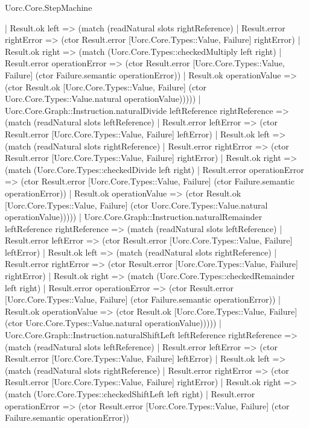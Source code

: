 \begin{lexlean}{Uorc.Core.StepMachine}
\begin{semanticmodule}
{      | Result.ok left => (match (readNatural slots rightReference)
        | Result.error rightError => (ctor Result.error [Uorc.Core.Types::Value, Failure] rightError)
        | Result.ok right => (match (Uorc.Core.Types::checkedMultiply left right)
          | Result.error operationError => (ctor Result.error [Uorc.Core.Types::Value, Failure] (ctor Failure.semantic operationError))
          | Result.ok operationValue => (ctor Result.ok [Uorc.Core.Types::Value, Failure] (ctor Uorc.Core.Types::Value.natural operationValue)))))
    | Uorc.Core.Graph::Instruction.naturalDivide leftReference rightReference => (match (readNatural slots leftReference)
      | Result.error leftError => (ctor Result.error [Uorc.Core.Types::Value, Failure] leftError)
      | Result.ok left => (match (readNatural slots rightReference)
        | Result.error rightError => (ctor Result.error [Uorc.Core.Types::Value, Failure] rightError)
        | Result.ok right => (match (Uorc.Core.Types::checkedDivide left right)
          | Result.error operationError => (ctor Result.error [Uorc.Core.Types::Value, Failure] (ctor Failure.semantic operationError))
          | Result.ok operationValue => (ctor Result.ok [Uorc.Core.Types::Value, Failure] (ctor Uorc.Core.Types::Value.natural operationValue)))))
    | Uorc.Core.Graph::Instruction.naturalRemainder leftReference rightReference => (match (readNatural slots leftReference)
      | Result.error leftError => (ctor Result.error [Uorc.Core.Types::Value, Failure] leftError)
      | Result.ok left => (match (readNatural slots rightReference)
        | Result.error rightError => (ctor Result.error [Uorc.Core.Types::Value, Failure] rightError)
        | Result.ok right => (match (Uorc.Core.Types::checkedRemainder left right)
          | Result.error operationError => (ctor Result.error [Uorc.Core.Types::Value, Failure] (ctor Failure.semantic operationError))
          | Result.ok operationValue => (ctor Result.ok [Uorc.Core.Types::Value, Failure] (ctor Uorc.Core.Types::Value.natural operationValue)))))
    | Uorc.Core.Graph::Instruction.naturalShiftLeft leftReference rightReference => (match (readNatural slots leftReference)
      | Result.error leftError => (ctor Result.error [Uorc.Core.Types::Value, Failure] leftError)
      | Result.ok left => (match (readNatural slots rightReference)
        | Result.error rightError => (ctor Result.error [Uorc.Core.Types::Value, Failure] rightError)
        | Result.ok right => (match (Uorc.Core.Types::checkedShiftLeft left right)
          | Result.error operationError => (ctor Result.error [Uorc.Core.Types::Value, Failure] (ctor Failure.semantic operationError))
}
\end{semanticmodule}
\end{lexlean}
